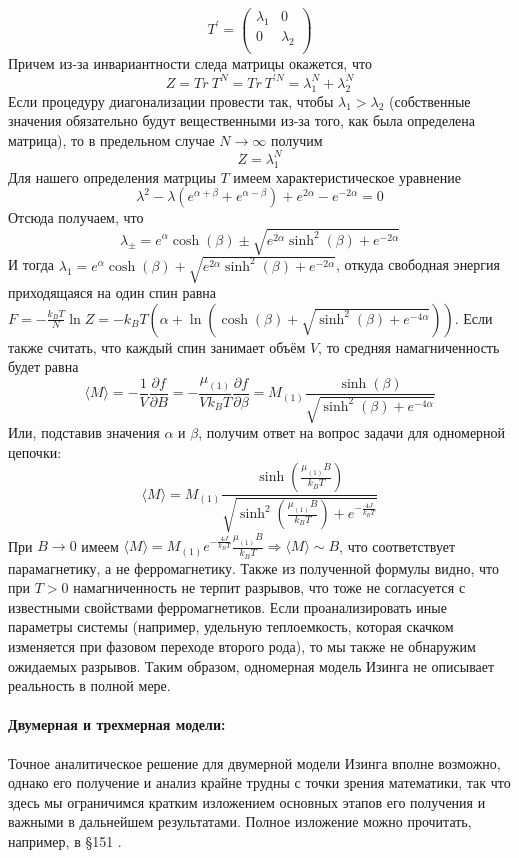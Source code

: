 \documentclass[oneside,final,14pt]{extarticle}
\begin{document}
$$
T^\prime=
\begin{pmatrix}
\lambda_{1} & 0 \\
0 & \lambda_{2} \\
\end{pmatrix}
$$
	Причем из-за инвариантности следа матрицы окажется, что 
$$Z=Tr \ T^{N}=Tr \ T^{\prime N}=\lambda_{1}^N+\lambda_{2}^{N}$$
	Если процедуру диагонализации провести так, чтобы $\lambda_{1} > \lambda_{2}$ (собственные значения обязательно будут вещественными из-за того, как была определена матрица), то в предельном случае $N\rightarrow \infty$ получим 
$$Z=\lambda_1^{N}$$
	Для нашего определения матрциы $T$ имеем характеристическое уравнение 
$$\lambda^2-\lambda(e^{\alpha+\beta}+e^{\alpha-\beta})+e^{2\alpha}-e^{-2\alpha}=0$$
	Отсюда получаем, что 
$$\lambda_{\pm}=e^{\alpha}\cosh(\beta)\pm\sqrt{e^{2\alpha}\sinh^{2}(\beta)+e^{-2\alpha}}$$
	И тогда $\lambda_{1}=e^{\alpha}\cosh(\beta)+\sqrt{e^{2\alpha}\sinh^{2}(\beta)+e^{-2\alpha}}$, откуда свободная энергия приходящаяся на один спин равна $F=-\frac{k_{B}T}{N}\ln Z=-k_{B}T\left(\alpha+\ln\left(\cosh(\beta)+\sqrt{\sinh^{2}(\beta)+e^{-4\alpha}}\right)\right)$. Если также считать, что каждый спин занимает объём $V$, то средняя намагниченность будет равна 
$$\langle M \rangle=-\frac{1}{V}\frac{\partial f}{\partial B}=-\frac{\mu_{(1)}}{Vk_{B}T}\frac{\partial f}{\partial \beta}=M_{(1)}\frac{\sinh(\beta)}{\sqrt{\sinh^2(\beta)+e^{-4\alpha}}}$$
	Или, подставив значения $\alpha$ и $\beta$, получим ответ на вопрос задачи для одномерной цепочки:
$$\boxed{\langle M \rangle = M_{(1)}\frac{\sinh\left(\frac{\mu_{(1)}B}{k_{B}T}\right)}{\sqrt{\sinh^2\left(\frac{\mu_{(1)}B}{k_{B}T}\right)+e^{-\frac{4J}{k_{B}T}}}}}$$ 
	При $B\rightarrow 0$ имеем $\langle M \rangle=M_{(1)}e^{-\frac{4J}{k_{B}T}}\frac{\mu_(1)B}{k_{B}T} \Rightarrow \langle M \rangle \sim B$, что соответствует парамагнетику, а не ферромагнетику. Также из полученной формулы видно, что при $T>0$ намагниченность не терпит разрывов, что тоже не согласуется с известными свойствами ферромагнетиков. Если проанализировать иные параметры системы (например, удельную теплоемкость, которая скачком изменяется при фазовом переходе второго рода), то мы также не обнаружим ожидаемых разрывов. Таким образом, одномерная модель Изинга не описывает реальность в полной мере. 
	\paragraph{Двумерная и трехмерная модели:}
	Точное аналитическое решение для двумерной модели Изинга вполне возможно, однако его получение и анализ крайне трудны с точки зрения математики, так что здесь мы ограничимся кратким изложением основных этапов его получения и важными в дальнейшем результатами. Полное изложение можно прочитать, например, в \S 151 \cite{land5}.
\end{document}
